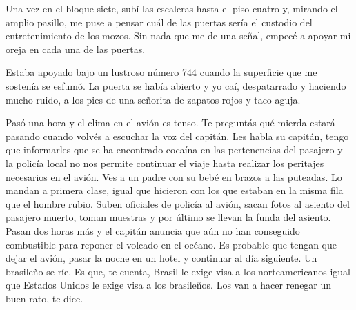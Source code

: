 \documentclass[11pt,twoside,openright,a6paper]{book}
\begin{document}
\vspace{0.5cm}
\hrulefill\hspace{0.2cm} \decofourleft\decofourright \hspace{0.2cm} \hrulefill
\vspace{0.5cm}

Una vez en el bloque siete, subí las escaleras hasta el piso cuatro y,
mirando el amplio pasillo, me puse a pensar cuál de las puertas sería el
custodio del entretenimiento de los mozos. Sin nada que me de una señal,
empecé a apoyar mi oreja en cada una de las puertas.

Estaba apoyado bajo un lustroso número 744 cuando la superficie que me
sostenía se esfumó. La puerta se había abierto y yo caí, despatarrado
y haciendo mucho ruido, a los pies de una señorita de zapatos rojos y
taco aguja.


\vspace{0.5cm}
\hrulefill\hspace{0.2cm} \decofourleft\decofourright \hspace{0.2cm} \hrulefill
\vspace{0.5cm}

Pasó una hora y el clima en el avión es tenso. Te preguntás qué mierda
estará pasando cuando volvés a escuchar la voz del capitán. Les habla
su capitán, tengo que informarles que se ha encontrado cocaína en las
pertenencias del pasajero y la policía local no nos permite continuar el
viaje hasta realizar los peritajes necesarios en el avión. Ves a un padre
con su bebé en brazos a las puteadas. Lo mandan a primera clase, igual que
hicieron con los que estaban en la misma fila que el hombre rubio. Suben
oficiales de policía al avión, sacan fotos al asiento del pasajero muerto,
toman muestras y por último se llevan la funda del asiento. Pasan dos
horas más y el capitán anuncia que aún no han conseguido combustible para
reponer el volcado en el océano. Es probable que tengan que dejar el avión,
pasar la noche en un hotel y continuar al día siguiente. Un brasileño se
ríe. Es que, te cuenta, Brasil le exige visa a los norteamericanos igual
que Estados Unidos le exige visa a los brasileños. Los van a hacer renegar
un buen rato, te dice.


\vspace{0.5cm}
\hrulefill\hspace{0.2cm} \decofourleft\decofourright \hspace{0.2cm} \hrulefill
\vspace{0.5cm}
\end{document}
